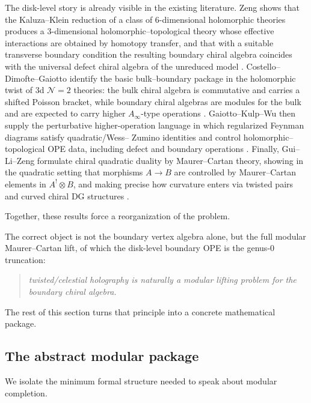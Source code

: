 The disk-level story is already visible in the existing literature. Zeng shows that the
Kaluza--Klein reduction of a class of $6$-dimensional holomorphic theories produces a
$3$-dimensional holomorphic--topological theory whose effective interactions are obtained by
homotopy transfer, and that with a suitable transverse boundary condition the resulting
boundary chiral algebra coincides with the universal defect chiral algebra of the unreduced
model \cite{ZengTwistedHolography}. Costello--Dimofte--Gaiotto identify the basic
bulk--boundary package in the holomorphic twist of $3$d $\mathcal N=2$ theories: the bulk
chiral algebra is commutative and carries a shifted Poisson bracket, while boundary chiral
algebras are modules for the bulk and are expected to carry higher $A_\infty$-type operations
\cite{CostelloDimofteGaiottoBoundary}. Gaiotto--Kulp--Wu then supply the perturbative
higher-operation language in which regularized Feynman diagrams satisfy quadratic/Wess--
Zumino identities and control holomorphic--topological OPE data, including defect and
boundary operations \cite{GaiottoKulpWuHigher}. Finally, Gui--Li--Zeng formulate chiral
quadratic duality by Maurer--Cartan theory, showing in the quadratic setting that morphisms
$A\to B$ are controlled by Maurer--Cartan elements in $A^!\otimes B$, and making precise
how curvature enters via twisted pairs and curved chiral DG structures
\cite{GuiLiZengQuadraticDuality}.

Together, these results force a reorganization of the problem.

The correct object is not the boundary vertex algebra alone, but the full modular
Maurer--Cartan lift, of which the disk-level boundary OPE is
the genus-$0$ truncation:
\begin{quote}
\emph{twisted/celestial holography is naturally a modular lifting problem for the boundary
chiral algebra.}
\end{quote}

The rest of this section turns that principle into a concrete mathematical package.

\subsection{The abstract modular package}

We isolate the minimum formal structure needed to speak about modular completion.

